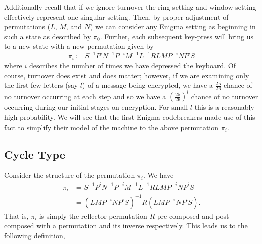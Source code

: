 \noindent Additionally recall that if we ignore turnover the ring setting and
window setting effectively represent one singular setting.
Then, by proper adjustment of permutations ($L$, $M$, and $N$) we can
consider any Enigma setting as beginning in such a state as described
by $\pi_0$. Further, each subsequent key-press will bring us to a new
state with a new permutation given by
\[
  \pi_i \coloneq S^{-1}P^{i}N^{-1}P^{-i}M^{-1}L^{-1}RLMP^{-i}NP^{i}S
\]
where $i$ describes the number of times we have depressed the
keyboard. Of course, turnover does exist and does matter; however, if
we are examining only the first few letters (say $l$) of a message
being encrypted, we have a $\frac{25}{26}$ chance of no turnover
occurring at each step and so we have a $(\frac{25}{26})^l$ chance of
no turnover occurring during our initial stages on encryption. For
small $l$ this is a reasonably high probability. We will see that the
first Enigma codebreakers made use of this
fact to simplify their model of the machine to the above permutation $\pi_i$.

\subsection{Cycle Type}
Consider the structure of the permutation $\pi_i$. We have
\begin{align*}
  \pi_i & = S^{-1}P^{i}N^{-1}P^{-i}M^{-1}L^{-1}RLMP^{-i}NP^{i}S \\
  & = (LMP^{-i}NP^{i}S)^{-1}R(LMP^{-i}NP^{i}S).
\end{align*}
That is, $\pi_i$ is simply the reflector permutation $R$
pre-composed and post-composed with a permutation and its inverse
respectively. This leads us to the following definition,


